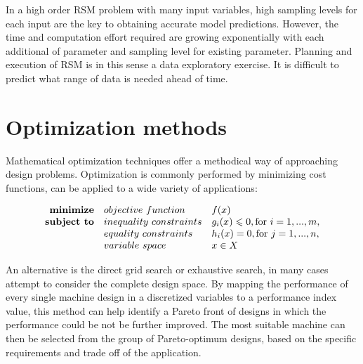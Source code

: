         
        In a high order \acs{RSM} problem with many input variables, high sampling levels for each input are the key to obtaining accurate model predictions. However, the time and computation effort required are growing exponentially with each additional of parameter and sampling level for existing parameter. Planning and execution of \acs{RSM} is in this sense a data exploratory exercise. It is difficult to predict what range of data is needed ahead of time.


\section{Optimization methods}                      \label{Chapter:background/optimization methods}
    
    
    Mathematical optimization techniques offer a methodical way of approaching design problems. Optimization is commonly performed by minimizing cost functions, can be applied to a wide variety of applications:
    
        
    \begin{equation}
        \begin{array}{rll}
            \textbf{minimize}       & \small{objective\,\,function}         & f(x)\\ 
            \textbf{subject to}     & \small{inequality\,\,constraints}     & g_i(x) \leqslant 0, \text{for } i= 1,...,m,\\ 
                                    & \small{equality\,\,constraints}       & h_i(x) = 0, \text{for } j= 1,...,n,\\ 
                                    & \small{variable\,\,space}             & x \in X
        \end{array}
    \end{equation}
    
    
    An alternative is the direct grid search or exhaustive search, in many cases attempt to consider the complete design space. By mapping the performance of every single machine design in a discretized variables to a performance index value, this method can help identify a Pareto front of designs in which the performance could be not be further improved. The most suitable machine can then be selected from the group of Pareto-optimum designs, based on the specific requirements and trade off of the application.
    
